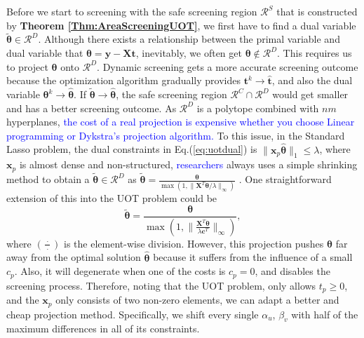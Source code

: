 \documentclass[twoside]{article}
\theoremstyle{plain}
\newcommand{\mat}[1]{\mathbf{#1}}
\renewcommand{\vec}[1]{\bm{#1}}
\newcommand{\changeXS}[1]{\textcolor{blue}{#1}}
\begin{document}
Before we start to screening with the safe screening region $\mathcal{R}^S$ that is constructed by {\bf Theorem \ref{Thm:AreaScreeningUOT}}, we first have to find a dual variable $\tilde{\vec{\theta}}\in\mathcal{R}^{D}$. Although there exists a relationship between the primal variable and dual variable that $\vec{\theta} = \vec{y} - \mat{X}\vec{t}$, inevitably, we often get $\vec{\theta} \notin \mathcal{R}^{D}$. This requires us to project $\vec{\theta}$ onto $\mathcal{R}^{D}$. Dynamic screening gets a more accurate screening outcome because the optimization algorithm gradually provides $\vec t^{k} \rightarrow \hat{\vec t}$, and also the dual variable $\vec \theta^{k} \rightarrow \hat{\vec \theta}$. If $\vec{ \tilde{\theta}}\rightarrow \hat{\vec \theta}$, the safe screening region $\mathcal{R}^{C}\cap\mathcal{R}^{D}$ would get smaller and has a better screening outcome. As $\mathcal{R}^{D}$ is a polytope combined with $nm$ hyperplanes, \changeXS{the cost of a real projection is expensive whether you choose Linear programming or Dykstra's projection algorithm.} To this issue, in the Standard Lasso problem, the dual constraints in {Eq.(\ref{eq:uotdual})} is $\|\vec{x}_p \hat{\vec{\theta}}\|_1\leq \lambda$, where $\vec{x}_p$ is almost dense and non-structured, \changeXS{researchers} always uses a simple shrinking method to obtain a $\tilde{\vec{\theta}} \in \mathcal{R}^{D}$ as 
$
\tilde{\vec{\theta}} = \frac{\vec\theta}{\max(1, \|{\mat{X}^T\vec\theta}/{\lambda}\|_{\infty})}
$ { \changeXS{\citep[Proposition 11]{JMLR:v18:16-577}} \citep[Theorem 11]{Yamada_NIPS_2021}}. 
One straightforward extension of this into the UOT problem could be  
\begin{equation*}
\tilde{\vec{\theta}} = \frac{\vec\theta}{\max(1, \|\frac{\mat{X}^T\vec\theta}{\lambda \vec{c}^{T}}\|_{\infty})}, 
\end{equation*}
where $(\frac{\ \cdot\ }{\cdot})$ is the element-wise division. However, this projection pushes $\vec{\theta}$ far away from the optimal solution $\hat{\vec{\theta}}$ because it suffers from the influence of a small $c_p$. Also, it will degenerate when one of the costs is $c_p = 0$, and disables the screening process. 
%
Therefore, noting that the UOT problem, only allows $t_p \geq 0$, and the $\vec{x}_p$ only consists of two non-zero elements, we can adapt a better and cheap projection method. Specifically, we shift every single $\alpha_u$, $\beta_v$ with half of the maximum differences in all of its constraints.
%
\end{document}
